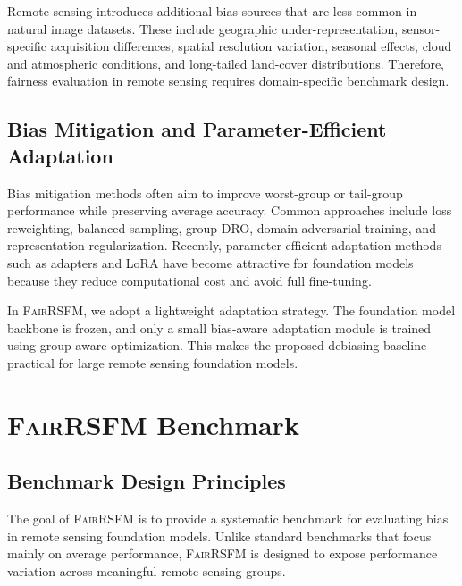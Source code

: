\documentclass[10pt,twocolumn,letterpaper]{article}
\newcommand{\method}{\textsc{FairRSFM}\xspace}
\begin{document}
Remote sensing introduces additional bias sources that are less common in natural image datasets. These include geographic under-representation, sensor-specific acquisition differences, spatial resolution variation, seasonal effects, cloud and atmospheric conditions, and long-tailed land-cover distributions. Therefore, fairness evaluation in remote sensing requires domain-specific benchmark design.

\subsection{Bias Mitigation and Parameter-Efficient Adaptation}

Bias mitigation methods often aim to improve worst-group or tail-group performance while preserving average accuracy. Common approaches include loss reweighting, balanced sampling, group-DRO, domain adversarial training, and representation regularization. Recently, parameter-efficient adaptation methods such as adapters and LoRA have become attractive for foundation models because they reduce computational cost and avoid full fine-tuning.

In \method, we adopt a lightweight adaptation strategy. The foundation model backbone is frozen, and only a small bias-aware adaptation module is trained using group-aware optimization. This makes the proposed debiasing baseline practical for large remote sensing foundation models.

\section{\method Benchmark}

\subsection{Benchmark Design Principles}

The goal of \method is to provide a systematic benchmark for evaluating bias in remote sensing foundation models. Unlike standard benchmarks that focus mainly on average performance, \method is designed to expose performance variation across meaningful remote sensing groups.
\end{document}
